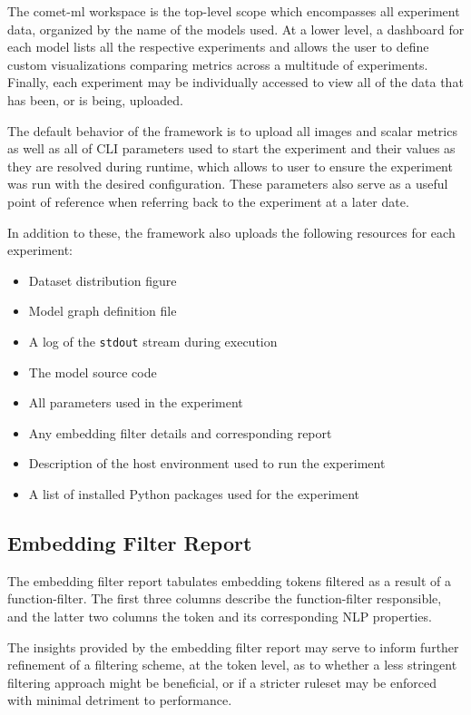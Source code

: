 \documentclass[../../fyp.tex]{subfiles}
\begin{document}
The comet-ml workspace is the top-level scope which encompasses all experiment data, organized by the name of the models used. At a lower level, a dashboard for each model lists all the respective experiments and allows the user to define custom visualizations comparing metrics across a multitude of experiments. Finally, each experiment may be individually accessed to view all of the data that has been, or is being, uploaded.

The default behavior of the framework is to upload all images and scalar metrics as well as all of CLI parameters used to start the experiment and their values as they are resolved during runtime, which allows to user to ensure the experiment was run with the desired configuration. These parameters also serve as a useful point of reference when referring back to the experiment at a later date. 

In addition to these, the framework also uploads the following resources for each experiment:
\begin{itemize}
\item Dataset distribution figure
\item Model graph definition file
\item A log of the \texttt{stdout} stream during execution
\item The model source code
\item All parameters used in the experiment
\item Any embedding filter details and corresponding report
\item Description of the host environment used to run the experiment 
\item A list of installed Python packages used for the experiment
\end{itemize}

\subsection{Embedding Filter Report}
The embedding filter report tabulates embedding tokens filtered as a result of a function-filter. The first three columns describe the function-filter responsible, and the latter two columns the token and its corresponding NLP properties. 

The insights provided by the embedding filter report may serve to inform further refinement of a filtering scheme, at the token level, as to whether a less stringent filtering approach might be beneficial, or if a stricter ruleset may be enforced with minimal detriment to performance. 
\end{document}
